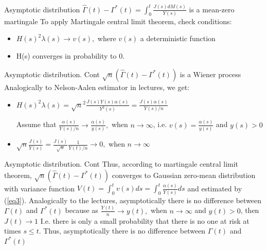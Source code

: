 \documentclass{beamer}
\begin{document}
\begin{frame}{Asymptotic distribution}
$\hat\Gamma(t) - \Gamma^*(t) = \int_0^t \frac{J(s) dM(s)}{Y(s)}$ is a mean-zero martingale
\newline
To apply Martingale central limit theorem, check conditions:
\begin{itemize}
    \item $H(s)^2 \lambda(s) \rightarrow v(s),$ where $v(s)$ a deterministic function
    \item H(s) converges in probability to 0.
\end{itemize}
\end{frame}
   
\begin{frame}{Asymptotic distribution. Cont}
$\sqrt{n}(\hat\Gamma(t) - \Gamma^*(t))$ is a Wiener process  
\newline
Analogically to Nelson-Aalen estimator in lectures, we get:
\newline
\begin{itemize}
    \item $H(s)^2 \lambda(s) =\sqrt{n}^2 \frac{J(s)Y(s)\alpha(s)}{Y^2(s)} = \frac{J(s)\alpha(s)}{Y(s)/n}$
    
    
    Assume that $\frac{\alpha(s)}{Y(s)/n} \rightarrow \frac{\alpha(s)}{y(s)} ,$ when $n \rightarrow \infty$, i.e. $v(s) = \frac{\alpha(s)}{y(s)}$ and $y(s) > 0$
    
    
    \item $\sqrt{n}\frac{J(s)}{Y(s)} = \frac{J(s)}{\sqrt{n}} \frac{1}{Y(t) / n} \rightarrow 0,$ when $n \rightarrow \infty$
    
\end{itemize}
\end{frame}

\begin{frame}{Asymptotic distribution. Cont}
Thus, according to martingale central limit theorem, $\sqrt{n}(\hat\Gamma(t) - \Gamma^*(t))$ converges to Gaussian zero-mean distribution with variance function $V(t) = \int_0^t v(s) ds = \int_0^t \frac{\alpha(s)}{Y(s)}ds$ and estimated by (\ref{eq3}).
\newline
\newline
Analogically to the lectures, asymptotically there is no difference between $\Gamma(t)$ and $\Gamma^*(t)$ because as $\frac{Y(t)}{n} \rightarrow y(t),$ when $n \rightarrow \infty$ and $y(t) > 0$, then $J(t) \rightarrow 1$ 
\newline   
\newline
I.e. there is only a small probability that there is no one at risk at times $s \leq t$.
Thus, asymptotically there is no difference between $\Gamma(t)$ and $\Gamma^*(t)$
\end{frame}
\end{document}
